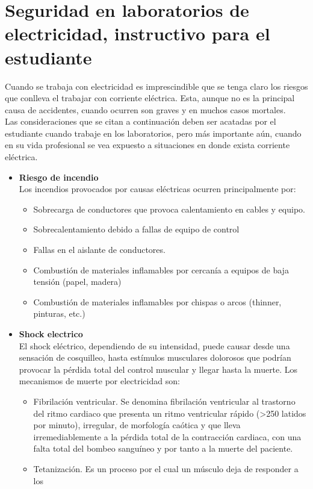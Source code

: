 \documentclass{report}
\begin{document}
\chapter{Seguridad en laboratorios de electricidad, instructivo para el estudiante}
Cuando se trabaja con electricidad es imprescindible que se tenga claro los
riesgos que conlleva el trabajar con corriente eléctrica. Esta, aunque no es la
principal causa de accidentes, cuando ocurren son graves y en muchos casos
mortales.\\
Las consideraciones que se citan a continuación deben ser acatadas por el
estudiante cuando trabaje en los laboratorios, pero más importante aún, cuando
en su vida profesional se vea expuesto a situaciones en donde exista corriente
eléctrica.\\
\begin{itemize}
\item \textbf{Riesgo de incendio}\\
Los incendios provocados por causas eléctricas ocurren principalmente por:
\begin{itemize}
\item Sobrecarga de conductores que provoca calentamiento en cables y equipo.
\item Sobrecalentamiento debido a fallas de equipo de control
\item Fallas en el aislante de conductores.
\item Combustión de materiales inflamables por cercanía a equipos de baja
tensión (papel, madera)
\item Combustión de materiales inflamables por chispas o arcos (thinner,
pinturas, etc.)
\end{itemize}
\item \textbf{Shock electrico}\\
El shock eléctrico, dependiendo de su intensidad, puede causar desde una
sensación de cosquilleo, hasta estímulos musculares dolorosos que podrían
provocar la pérdida total del control muscular y llegar hasta la muerte.
Los mecanismos de muerte por electricidad son:
\begin{itemize}
\item Fibrilación ventricular. Se denomina fibrilación ventricular al trastorno del
ritmo cardiaco que presenta un ritmo ventricular rápido (>250 latidos por
minuto), irregular, de morfología caótica y que lleva irremediablemente a la
pérdida total de la contracción cardiaca, con una falta total del bombeo
sanguíneo y por tanto a la muerte del paciente.
\item Tetanización. Es un proceso por el cual un músculo deja de responder a los

\end{itemize}
\end{itemize}
\end{document}
